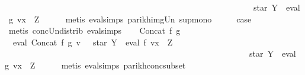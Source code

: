 \begin{isabellebody}
\ \ \ \ \ \ \ \ \ \ \ \ \ \ \ \ \ \ \ \ \ \ \ \ \ \ \ \ \ \ \ \ \ \ \ \ \ \ \ \ \ \ \ \ \ \ \ \ \ \ \ \ \ \ \ \ \ \ \ \ star\ Y\ {\isacharat}{\kern0pt}{\isacharat}{\kern0pt}\ eval\ g\ {\isacharparenleft}{\kern0pt}v{\isacharparenleft}{\kern0pt}x\ {\isacharcolon}{\kern0pt}{\isacharequal}{\kern0pt}\ Z{\isacharparenright}{\kern0pt}{\isacharparenright}{\kern0pt}{\isacharparenright}{\kern0pt}{\isachardoublequoteclose}\isanewline
\ \ \ \ \isamarkupfalse%
\ {\isacharparenleft}{\kern0pt}metis\ eval{\isachardot}{\kern0pt}simps{\isacharparenleft}{\kern0pt}{}{\isacharparenright}{\kern0pt}\ parikh{\isacharunderscore}{\kern0pt}img{\isacharunderscore}{\kern0pt}Un\ sup{\isachardot}{\kern0pt}mono{\isacharparenright}{\kern0pt}\isanewline
\ \ \isamarkupfalse%
\ \isamarkupfalse%
\ {\isacharquery}{\kern0pt}case\ \isamarkupfalse%
\ {\isacharparenleft}{\kern0pt}metis\ conc{\isacharunderscore}{\kern0pt}Un{\isacharunderscore}{\kern0pt}distrib{\isacharparenleft}{\kern0pt}{}{\isacharparenright}{\kern0pt}\ eval{\isachardot}{\kern0pt}simps{\isacharparenleft}{\kern0pt}{}{\isacharparenright}{\kern0pt}{\isacharparenright}{\kern0pt}\isanewline
{}\isamarkupfalse%
\isanewline
\ \ \isamarkupfalse%
\ {\isacharparenleft}{\kern0pt}Concat\ f\ g{\isacharparenright}{\kern0pt}\isanewline
\ \ \isamarkupfalse%
\ \isamarkupfalse%
\ {\isachardoublequoteopen}{\isasymPsi}\ {\isacharparenleft}{\kern0pt}eval\ {\isacharparenleft}{\kern0pt}Concat\ f\ g{\isacharparenright}{\kern0pt}\ v{\isacharparenright}{\kern0pt}\ {\isasymsubseteq}\ {\isasymPsi}\ {\isacharparenleft}{\kern0pt}{\isacharparenleft}{\kern0pt}star\ Y\ {\isacharat}{\kern0pt}{\isacharat}{\kern0pt}\ eval\ f\ {\isacharparenleft}{\kern0pt}v{\isacharparenleft}{\kern0pt}x\ {\isacharcolon}{\kern0pt}{\isacharequal}{\kern0pt}\ Z{\isacharparenright}{\kern0pt}{\isacharparenright}{\kern0pt}{\isacharparenright}{\kern0pt}\isanewline
\ \ \ \ \ \ \ \ \ \ \ \ \ \ \ \ \ \ \ \ \ \ \ \ \ \ \ \ \ \ \ \ \ \ \ \ \ \ \ \ \ \ \ \ \ \ \ \ \ \ \ \ \ \ \ \ \ \ {\isacharat}{\kern0pt}{\isacharat}{\kern0pt}\ star\ Y\ {\isacharat}{\kern0pt}{\isacharat}{\kern0pt}\ eval\ g\ {\isacharparenleft}{\kern0pt}v{\isacharparenleft}{\kern0pt}x\ {\isacharcolon}{\kern0pt}{\isacharequal}{\kern0pt}\ Z{\isacharparenright}{\kern0pt}{\isacharparenright}{\kern0pt}{\isacharparenright}{\kern0pt}{\isachardoublequoteclose}\isanewline
\ \ \ \ \isamarkupfalse%
\ {\isacharparenleft}{\kern0pt}metis\ eval{\isachardot}{\kern0pt}simps{\isacharparenleft}{\kern0pt}{}{\isacharparenright}{\kern0pt}\ parikh{\isacharunderscore}{\kern0pt}conc{\isacharunderscore}{\kern0pt}subset{\isacharparenright}{\kern0pt}\isanewline

\end{isabellebody}
